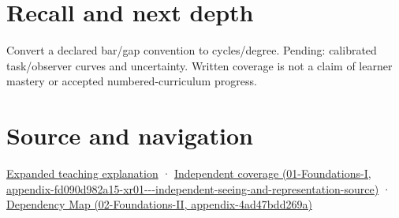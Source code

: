 \section{Recall and next depth}\label{appendix-b491fc48c54b-recall-and-next-depth}

Convert a declared bar/gap convention to cycles/degree. Pending: calibrated task/observer curves and uncertainty. Written coverage is not a claim of learner mastery or accepted numbered-curriculum progress.

\section{Source and navigation}\label{appendix-b491fc48c54b-source-and-navigation}

\href{Continuous\%20Notes/University\%20-\%20Worlds,\%20Images\%20and\%20Inference\%20-\%20Graphics,\%20Vision\%20and\%20Photography\#Visibility\%20is\%20about\%20contrast,\%20conditions\%20and\%20tasks}{Expanded teaching explanation} · \href{../01-Foundations-I/main.pdf\#nameddest=appendix-fd090d982a15-xr01---independent-seeing-and-representation-source}{Independent coverage (01-Foundations-I, appendix-fd090d982a15-xr01-\/-\/-independent-seeing-and-representation-source)} · \href{../02-Foundations-II/main.pdf\#nameddest=appendix-4ad47bdd269a}{Dependency Map (02-Foundations-II, appendix-4ad47bdd269a)}
